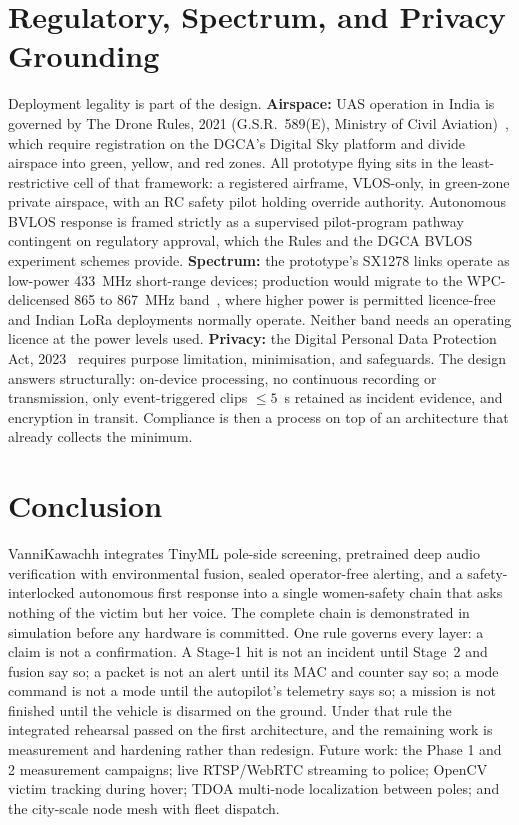 \documentclass[conference]{IEEEtran}
\begin{document}
\section{Regulatory, Spectrum, and Privacy Grounding}
\label{sec:regulatory}

Deployment legality is part of the design. \textbf{Airspace:} UAS
operation in India is governed by The Drone Rules, 2021
(G.S.R.~589(E), Ministry of Civil Aviation)~\cite{dronerules}, which
require registration on the DGCA's Digital Sky platform and divide
airspace into green, yellow, and red zones. All prototype flying sits
in the least-restrictive cell of that framework: a registered
airframe, VLOS-only, in green-zone private airspace, with an RC safety
pilot holding override authority. Autonomous BVLOS response is framed
strictly as a supervised pilot-program pathway contingent on
regulatory approval, which the Rules and the DGCA BVLOS experiment
schemes provide. \textbf{Spectrum:} the prototype's SX1278 links
operate as low-power 433~MHz short-range devices; production would
migrate to the WPC-delicensed 865 to 867~MHz band~\cite{wpc}, where
higher power is permitted licence-free and Indian LoRa deployments
normally operate. Neither band needs an operating licence at the power
levels used. \textbf{Privacy:} the Digital Personal Data Protection
Act, 2023~\cite{dpdp} requires purpose limitation, minimisation, and
safeguards. The design answers structurally: on-device processing, no
continuous recording or transmission, only event-triggered clips
$\leq 5$~s retained as incident evidence, and encryption in transit.
Compliance is then a process on top of an architecture that already
collects the minimum.

\section{Conclusion}
\label{sec:conclusion}

VanniKawachh integrates TinyML pole-side screening, pretrained deep
audio verification with environmental fusion, sealed operator-free
alerting, and a safety-interlocked autonomous first response into a
single women-safety chain that asks nothing of the victim but her
voice. The complete chain is demonstrated in simulation before any
hardware is committed. One rule governs every layer: a claim is not a
confirmation. A Stage-1 hit is not an incident until Stage~2 and
fusion say so; a packet is not an alert until its MAC and counter say
so; a mode command is not a mode until the autopilot's telemetry says
so; a mission is not finished until the vehicle is disarmed on the
ground. Under that rule the integrated rehearsal passed on the first
architecture, and the remaining work is measurement and hardening
rather than redesign. Future work: the Phase 1 and 2 measurement
campaigns; live RTSP/WebRTC streaming to police; OpenCV victim
tracking during hover; TDOA multi-node localization between poles; and
the city-scale node mesh with fleet dispatch.
\end{document}
